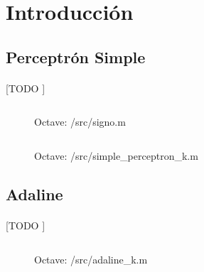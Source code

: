 \documentclass{article}
\begin{document}
	\maketitle %

	\thispagestyle{fancy} %



	\begin{abstract}
		\noindent [TODO ]
	\end{abstract}



	\section{Introducción}
	\label{sec:introducción}

		\subsection{Perceptrón Simple}
		\label{sec:simple_perceptron}

			\paragraph{}
			[TODO ]


			\begin{figure}[h]
				\centering
				\inputminted{octave}{./code/signo.m}
				\caption{Octave: /src/signo.m}
				\label{code:signo}
			\end{figure}

			\begin{figure}[h]
				\centering
				\inputminted{octave}{./code/simple_perceptron_k.m}
				\caption{Octave: /src/simple\_perceptron\_k.m}
				\label{code:simple_perceptron}
			\end{figure}

		\subsection{Adaline}
		\label{sec:adaline}

			\paragraph{}
			[TODO ]

			\begin{figure}[h]
				\centering
				\inputminted{octave}{./code/adaline_k.m}
				\caption{Octave: /src/adaline\_k.m}
				\label{code:adalne}
			\end{figure}
\end{document}
